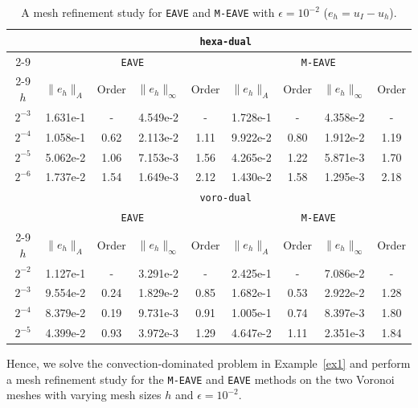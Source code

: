 \documentclass[a4paper]{article}
\theoremstyle{plain}
\theoremstyle{definition}
\numberwithin{equation}{section}
\newcommand{\norm}[1]{\lVert #1\rVert}
\begin{document}
\begin{table}[h!]
\footnotesize
    \caption{A mesh refinement study for \texttt{EAVE} and \texttt{M-EAVE} with $\epsilon=10^{-2}$ ($e_h=u_I-u_h$).}
    \label{table: mesh refinement_monotone}
    \centering
    \begin{tabular}{|c||c|c|c|c||c|c|c|c|}
    \hline
    &\multicolumn{8}{c|}{\texttt{hexa-dual}}\\
    \cline{2-9}   
    &\multicolumn{4}{c||}{\texttt{EAVE}} & \multicolumn{4}{c|}{\texttt{M-EAVE}}\\
    \cline{2-9}   
       $h$  & { $\norm{e_h}_A$} & {Order} &
       { $\norm{e_h}_\infty$} & {Order} &
       { $\norm{e_h}_A$} & {Order} &
       { $\norm{e_h}_\infty$} & {Order} \\ 
       \hline
       $2^{-3}$ & 1.631e-1 & - &  4.549e-2 & - & 1.728e-1 & - & 4.358e-2 & -\\
       \hline
       $2^{-4}$  & 1.058e-1 & 0.62 & 2.113e-2 & 1.11 & 9.922e-2 & 0.80 & 1.912e-2& 1.19  \\
       \hline
       $2^{-5}$   & 5.062e-2 & 1.06 & 7.153e-3 & 1.56 & 4.265e-2 & 1.22 & 5.871e-3 &1.70 \\
       \hline
       $2^{-6}$  & 1.737e-2 & 1.54 & 1.649e-3 & 2.12 & 1.430e-2 & 1.58 & 1.295e-3 & 2.18\\
       \hline
       \hline
    &\multicolumn{8}{c|}{\texttt{voro-dual}}\\
               \hline
    &\multicolumn{4}{c||}{\texttt{EAVE}} & \multicolumn{4}{c|}{\texttt{M-EAVE}}\\
                   \cline{2-9}   
        $h$ & {$\norm{e_h}_A$} & {Order} &
       {$\norm{e_h}_\infty$} & {Order} &
       {$\norm{e_h}_A$} & {Order} &
       {$\norm{e_h}_\infty$} & {Order} \\ 
       \hline
       $2^{-2}$ & 1.127e-1 & - &  3.291e-2 & - & 2.425e-1 & -  & 7.086e-2& -\\
       \hline
       $2^{-3}$  & 9.554e-2 & 0.24 & 1.829e-2 & 0.85 & 1.682e-1 & 0.53 & 2.922e-2 & 1.28 \\
       \hline
       $2^{-4}$   & 8.379e-2 & 0.19 & 9.731e-3 & 0.91 & 1.005e-1 & 0.74 & 8.397e-3 & 1.80\\
       \hline
       $2^{-5}$  & 4.399e-2 & 0.93 & 3.972e-3 & 1.29 & 4.647e-2 & 1.11 & 2.351e-3& 1.84\\
       \hline
    \end{tabular}
\end{table}
Hence, we solve the convection-dominated problem in Example~\ref{ex1} and perform a mesh refinement study for the \texttt{M-EAVE} and \texttt{EAVE} methods on the two Voronoi meshes with varying mesh sizes $h$ and $\epsilon =10^{-2}$.
\end{document}
